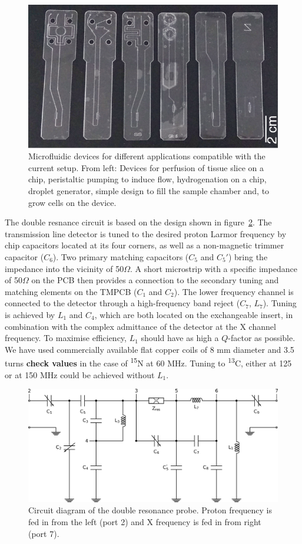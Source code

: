 \documentclass[preprint,12pt]{article}
\newcommand{\todo}[1]{{\color{red}\textbf{#1}}}
\begin{document}
\begin{figure}
\centering
\includegraphics[width=.7\linewidth,keepaspectratio=true]{./figures/ms5n17-tlp-im-181007-devices.png} 
\caption{Microfluidic devices for different applications compatible with the current setup. 
From left: Devices for perfusion of tissue slice on a chip, peristaltic pumping to induce flow, 
hydrogenation on a chip, droplet generator, simple design to fill the sample chamber and, 
to grow cells on the device.}
\label{fig:device} 
\end{figure}

The double resnance circuit is based on the design shown in figure~\ref{fig:circuit}. 
The transmission line detector is tuned to the desired proton 
Larmor frequency by chip capacitors located at its four corners, 
as well as a non-magnetic trimmer capacitor ($C_6$). Two primary 
matching capacitors ($C_5$ and $C_5'$) bring the impedance into the 
vicinity of 50$\Omega$. A short microstrip 
with a specific impedance of 50$\Omega$ 
on the PCB then provides a connection to the secondary tuning and matching elements on the TMPCB ($C_1$ and $C_2$).
The lower frequency channel is connected to the detector through a high-frequency band reject ($C_7$, $L_7$).
Tuning is achieved by $L_1$ and $C_4$, which are both located on the exchangeable insert, in combination with
the complex admittance of the detector at the X channel frequency.
To maximise efficiency, $L_1$ should have as high a $Q$-factor as possible. We have
used commercially available flat copper coils of 8 mm diameter and 3.5 turns \todo{check values} in the case of 
\textsuperscript{15}N at 60 MHz. Tuning to \textsuperscript{13}C, either at 125 or at 150 MHz 
could be achieved without $L_1$. 


\begin{figure}
\centering
\includegraphics[width=.7\linewidth,keepaspectratio=true]{./figures/ms5n17-tlp-im-180110-circuit-diagram.png}
\caption{Circuit diagram of the double resonance probe. 
Proton frequency is fed in from the left (port 2) and X frequency is fed in from right (port 7).}
\label{fig:circuit}
\end{figure}
\end{document}
